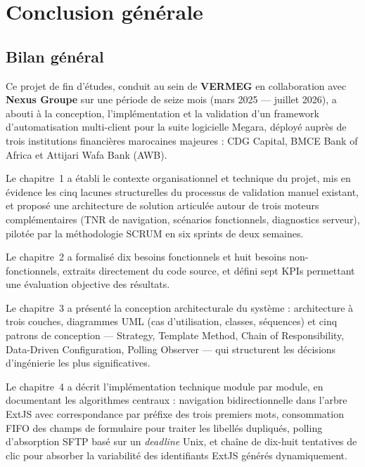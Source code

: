\documentclass[12pt, a4paper]{report}
\begin{document}
\newpage

\chapter*{Conclusion générale}

\section*{Bilan général}

Ce projet de fin d'études, conduit au sein de \textbf{VERMEG} en collaboration avec \textbf{Nexus Groupe} sur une période de seize mois (mars 2025 — juillet 2026), a abouti à la conception, l'implémentation et la validation d'un framework d'automatisation multi-client pour la suite logicielle Megara, déployé auprès de trois institutions financières marocaines majeures : CDG Capital, BMCE Bank of Africa et Attijari Wafa Bank (AWB).

Le chapitre~1 a établi le contexte organisationnel et technique du projet, mis en évidence les cinq lacunes structurelles du processus de validation manuel existant, et proposé une architecture de solution articulée autour de trois moteurs complémentaires (TNR de navigation, scénarios fonctionnels, diagnostics serveur), pilotée par la méthodologie SCRUM en six sprints de deux semaines.

Le chapitre~2 a formalisé dix besoins fonctionnels et huit besoins non-fonctionnels, extraits directement du code source, et défini sept KPIs permettant une évaluation objective des résultats.

Le chapitre~3 a présenté la conception architecturale du système : architecture à trois couches, diagrammes UML (cas d'utilisation, classes, séquences) et cinq patrons de conception — Strategy, Template Method, Chain of Responsibility, Data-Driven Configuration, Polling Observer — qui structurent les décisions d'ingénierie les plus significatives.

Le chapitre~4 a décrit l'implémentation technique module par module, en documentant les algorithmes centraux : navigation bidirectionnelle dans l'arbre ExtJS avec correspondance par préfixe des trois premiers mots, consommation FIFO des champs de formulaire pour traiter les libellés dupliqués, polling d'absorption SFTP basé sur un \textit{deadline} Unix, et chaîne de dix-huit tentatives de clic pour absorber la variabilité des identifiants ExtJS générés dynamiquement.
\end{document}
